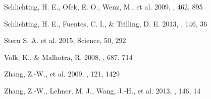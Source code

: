 \documentclass{pasj01}
\begin{document}
\begin{thebibliography}{}

 Schlichting, H. E., Ofek, E. O., Wenz, M., et al. 2009, \nat, 462, 895


 Schlichting, H. E., Fuentes, C. I., \& Trilling, D. E. 2013, \aj, 146, 36

 Stern S. A. et al. 2015, Science, 50, 292

 Volk, K., \& Malhotra, R. 2008, \apj, 687, 714



 Zhang, Z.-W., et al. 2009,  \pasp, 121, 1429

 Zhang, Z.-W., Lehner, M. J., Wang, J.-H., et al. 2013, \aj, 146, 14


\end{thebibliography}
\end{document}
